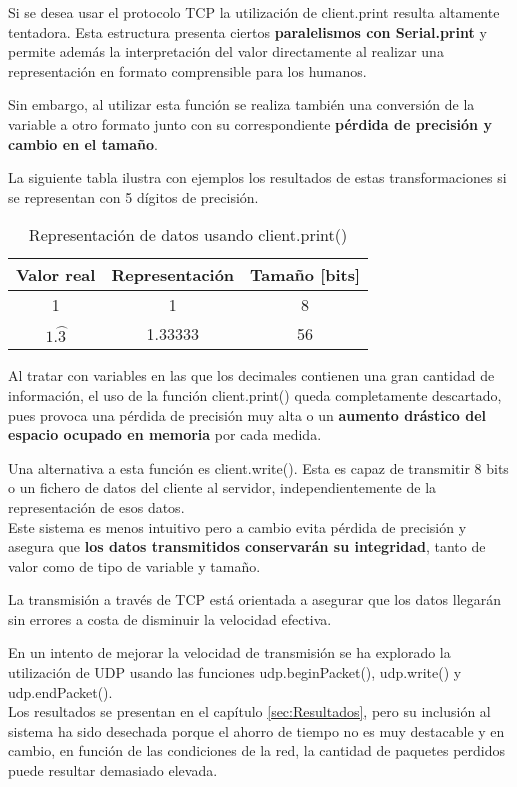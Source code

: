 Si se desea usar el protocolo TCP la utilización de client.print resulta altamente tentadora. Esta estructura presenta ciertos \textbf{paralelismos con Serial.print} y permite además la interpretación del valor directamente al realizar una representación en formato comprensible para los humanos.
 
Sin embargo, al utilizar esta función se realiza también una conversión de la variable a otro formato junto con su correspondiente \textbf{pérdida de precisión y cambio en el tamaño}. 

La siguiente tabla ilustra con ejemplos los resultados de estas transformaciones si se representan con 5 dígitos de precisión.

\clearpage

\begin{table} [H]
	\centering
	\begin{tabular}{|c|c|c|}
\hline 
\textbf{Valor real} & \textbf{Representación} & \textbf{Tamaño [bits]} \\ 
\hline 
1 & 1 & 8 \\ 
\hline 
$1.\wideparen{3}$ & 1.33333 & 56\footnotemark \\ 
\hline 
	\end{tabular} 
	\caption{Representación de datos usando client.print()}
	\label{tab:client_print_rep}
\end{table}

Al tratar con variables en las que los decimales contienen una gran cantidad de información, el uso de la función client.print() queda completamente descartado, pues provoca una pérdida de precisión muy alta o un \textbf{aumento drástico del espacio ocupado en memoria} por cada medida.

Una alternativa a esta función es client.write(). Esta es capaz de transmitir 8 bits o un fichero de datos del cliente al servidor, independientemente de la representación de esos datos.\\
Este sistema es menos intuitivo pero a cambio evita pérdida de precisión y asegura que \textbf{los datos transmitidos conservarán su integridad}, tanto de valor como de tipo de variable y tamaño.

La transmisión a través de TCP está orientada a asegurar que los datos llegarán sin errores a costa de disminuir la velocidad efectiva. 

En un intento de mejorar la velocidad de transmisión se ha explorado la utilización de UDP usando las funciones udp.beginPacket(), udp.write() y udp.endPacket().\\
Los resultados se presentan en el capítulo \ref{sec:Resultados}, pero su inclusión al sistema ha sido desechada porque el ahorro de tiempo no es muy destacable y en cambio, en función de las condiciones de la red, la cantidad de paquetes perdidos puede resultar demasiado elevada.

